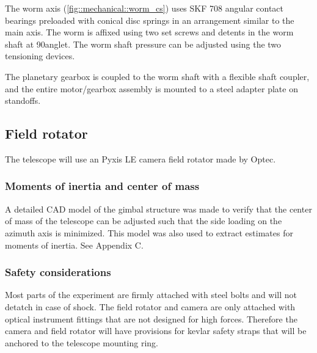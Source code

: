 The worm axis (\ref{fig::mechanical::worm_cs}) uses SKF 708 angular contact bearings preloaded with conical disc springs in an arrangement similar to the main axis. The worm is affixed using two set screws and detents in the worm shaft at 90\degree anglet. The worm shaft pressure can be adjusted using the two tensioning devices. 

The planetary gearbox is coupled to the worm shaft with a flexible shaft coupler, and the entire motor/gearbox assembly is mounted to a steel adapter plate on standoffs. 

\subsection{Field rotator}

The telescope will use an Pyxis LE camera field rotator made by Optec. 

\subsubsection{Moments of inertia and center of mass}

A detailed CAD model of the gimbal structure was made to verify that the center of mass of the telescope can be adjusted such that the side loading on the azimuth axis is minimized. This model was also used to extract estimates for moments of inertia. See Appendix C.

\subsubsection{Safety considerations}

Most parts of the experiment are firmly attached with steel bolts and will not detatch in case of shock. The field rotator and camera are only attached with optical instrument fittings that are not designed for high forces. Therefore the camera and field rotator will have provisions for kevlar safety straps that will be anchored to the telescope mounting ring. 
